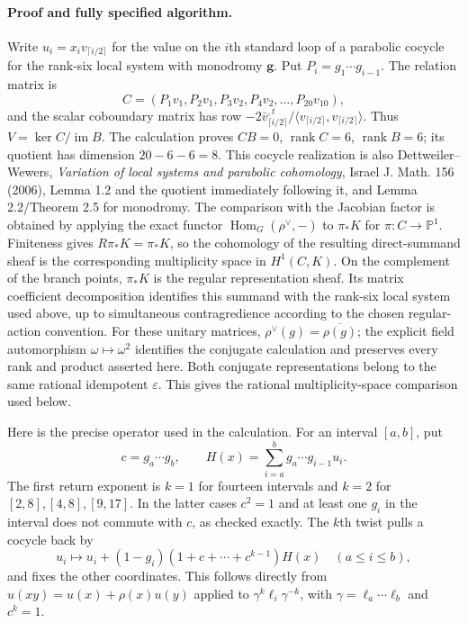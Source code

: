 \paragraph{Proof and fully specified algorithm.}
Write $u_i=x_iv_{\lceil i/2\rceil}$ for the value on the $i$th standard
loop of a parabolic cocycle for the rank-six local system with monodromy
$\boldsymbol g$. Put $P_i=g_1\cdots g_{i-1}$. The relation matrix is
\[
C=(P_1v_1,P_2v_1,P_3v_2,P_4v_2,\ldots,P_{20}v_{10}),
\]
and the scalar coboundary matrix has row
$-2\bar v_{\lceil i/2\rceil}^{,t}/\langle v_{\lceil i/2\rceil},
v_{\lceil i/2\rceil}\rangle$.
Thus $V=\ker C/\operatorname{im} B$.
The calculation proves $CB=0$, $\operatorname{rank}C=6$,
$\operatorname{rank}B=6$; its quotient has dimension $20-6-6=8$.
This cocycle realization is also Dettweiler--Wewers,
\emph{Variation of local systems and parabolic cohomology}, Israel J.
Math. 156 (2006), Lemma 1.2 and the quotient immediately following it,
and Lemma 2.2/Theorem 2.5 for monodromy.
The comparison with the Jacobian factor is obtained by applying the
exact functor $\operatorname{Hom}_G(\rho^\vee,-)$ to $\pi_*K$ for
$\pi:C\to\mathbb P^1$. Finiteness gives $R\pi_*K=\pi_*K$, so the
cohomology of the resulting direct-summand sheaf is the corresponding
multiplicity space in $H^1(C,K)$. On the complement of the branch
points, $\pi_*K$ is the regular representation sheaf. Its matrix
coefficient decomposition identifies this summand with the rank-six
local system used above, up to simultaneous contragredience according
to the chosen regular-action convention. For these unitary matrices,
$\rho^\vee(g)=\overline{\rho(g)}$; the explicit field automorphism
$\omega\mapsto\omega^2$ identifies the conjugate calculation and
preserves every rank and product asserted here. Both conjugate
representations belong to the same rational idempotent $\varepsilon$.
This gives the rational multiplicity-space comparison used below.

Here is the precise operator used in the calculation. For an interval
$[a,b]$, put
\[
c=g_a\cdots g_b,\qquad
H(x)=\sum_{i=a}^b g_a\cdots g_{i-1}u_i.
\]
The first return exponent is $k=1$ for fourteen intervals and $k=2$ for
$[2,8],[4,8],[9,17]$. In the latter cases $c^2=1$ and at least one
$g_i$ in the interval does not commute with $c$, as checked exactly.
The $k$th twist pulls a cocycle back by
\[
u_i\longmapsto u_i+(1-g_i)(1+c+\cdots+c^{k-1})H(x)
\quad(a\le i\le b),
\]
and fixes the other coordinates. This follows directly from
$u(xy)=u(x)+\rho(x)u(y)$ applied to
$\gamma^k\ell_i\gamma^{-k}$, with
$\gamma=\ell_a\cdots\ell_b$ and $c^k=1$.

